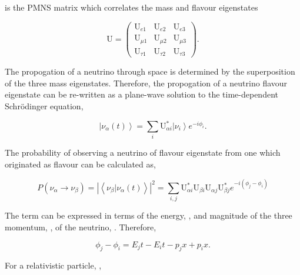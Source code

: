  is the PMNS matrix which correlates the mass and flavour eigenstates

\begin{equation}
  \label{eq:NeutrinoOscillationPhysics_PMNSReduced}
  \mathrm{U} = \begin{pmatrix} \mathrm{U}_{e1} & \mathrm{U}_{e2} & \mathrm{U}_{e3} \\ \mathrm{U}_{\mu 1} & \mathrm{U}_{\mu 2} & \mathrm{U}_{\mu 3} \\ \mathrm{U}_{\tau 1} & \mathrm{U}_{\tau 2} & \mathrm{U}_{\tau 3} \end{pmatrix}.
\end{equation}

The propogation of a neutrino through space is determined by the superposition of the three mass eigenstates. Therefore, the propogation of a neutrino flavour eigenstate can be re-written as a plane-wave solution to the time-dependent Schr{\"o}dinger equation,

\begin{equation}
  \label{eq:NeutrinoOscillationPhysics_TimeDepSuperposition}
  \left|\nu_{\alpha}(t)\right> = \sum_{i}\mathrm{U}^{*}_{\alpha i}\left|\nu_{i}\right>e^{-i \phi_{i}}.
\end{equation}

The probability of observing a neutrino of flavour eigenstate \quickmath{\beta} from one which originated as flavour \quickmath{\alpha} can be calculated as,

\begin{equation}
  \label{eq:NeutrinoOscillationPhysics_ProbabilityComplexForm}
  P(\nu_{\alpha} \rightarrow \nu_{\beta}) = \left| \left< \nu_{\beta} | \nu_{\alpha}(t) \right> \right|^{2} = \sum_{i,j} \mathrm{U}^{*}_{\alpha i}\mathrm{U}_{\beta i}\mathrm{U}_{\alpha j}\mathrm{U}^{*}_{\beta j} e^{-i(\phi_{j}-\phi_{i})}
\end{equation}

The  term can be expressed in terms of the energy, , and magnitude of the three momentum, , of the neutrino, . Therefore,

\begin{equation}
  \label{eq:NeutrinoOscillationPhysics_PhaseDifference}
  \phi_{j}-\phi_{i} = E_{j}t - E_{i}t - p_{j}x + p_{i}x .
\end{equation}

For a relativistic particle, ,


